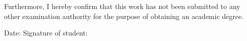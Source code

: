 \begin{titlepage}
    \vspace{0.8cm}
    \noindent Furthermore, I hereby confirm that this work has not been submitted to any other examination authority for the purpose of obtaining an academic degree.

    \vspace{1.5cm}
    \noindent Date: \underline{\hspace{4cm}}\hfill Signature of student: \underline{\hspace{6cm}}\par
\end{titlepage}
